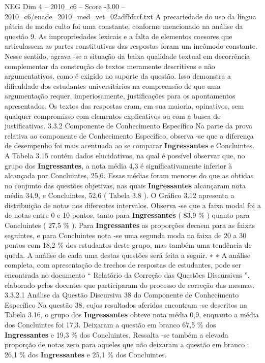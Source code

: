 \begin{textsample}{NEG Dim 4 – 2010\_c6 – Score -3.00 – 2010\_c6/enade\_2010\_med\_vet\_02adfbfccf.txt}
A precariedade do uso da língua pátria de modo culto foi uma constante, conforme mencionado na análise da questão 9.
As impropriedades lexicais e a falta de elementos coesores que articulassem as partes constitutivas das respostas foram um incômodo constante.
Nesse sentido, agrava -se a situação da baixa qualidade textual em decorrência complementar da construção de textos meramente descritivos e não argumentativos, como é exigido no suporte da questão.
Isso demonstra a dificuldade dos estudantes universitários na compreensão de que uma argumentação requer, imperiosamente, justificações para os apontamentos apresentados.
Os textos das respostas eram, em sua maioria, opinativos, sem qualquer compromisso com elementos explicativos ou com a busca de justificativas. 3.3.2 Componente de Conhecimento Específico Na parte da prova relativa ao componente de Conhecimento Específico, observa -se que a diferença de desempenho foi mais acentuada ao se comparar \textbf{Ingressantes} e Concluintes.
A Tabela 3.15 contém dados elucidativos, na qual é possível observar que, no grupo dos \textbf{Ingressantes}, a nota média 4,3 é significativamente inferior à alcançada por Concluintes, 25,6.
Essas médias foram menores do que as obtidas no conjunto das questões objetivas, nas quais \textbf{Ingressantes} alcançaram nota média 34,9, e Concluintes, 52,6 ( Tabela 3.8 ).
O Gráfico 3.12 apresenta a distribuição de notas nos diferentes intervalos.
Observa -se que a faixa modal foi a de notas entre 0 e 10 pontos, tanto para \textbf{Ingressantes} ( 83,9 \% ) quanto para Concluintes ( 27,5 \% ).
Para \textbf{Ingressantes} as proporções decaem para as faixas seguintes, e para Concluintes nota -se uma segunda moda na faixa de 20 a 30 pontos com 18,2 \% dos estudantes deste grupo, mas também uma tendência de queda.
A análise de cada uma destas questões será feita a seguir. ∗ ∗ A análise completa, com apresentação de trechos de respostas de estudantes, pode ser encontrada no documento “ Relatório da Correção das Questões Discursivas ”, elaborado pelos docentes que participaram do processo de correção das mesmas. 3.3.2.1 Análise da Questão Discursiva 38 do Componente de Conhecimento Específico Na questão 38, cujos resultados aferidos encontram -se descritos na Tabela 3.16, o grupo dos \textbf{Ingressantes} obteve nota média 0,9, enquanto a média dos Concluintes foi 17,3.
Deixaram a questão em branco 67,5 \% dos \textbf{Ingressantes} e 19,3 \% dos Concluintes.
Ressalta -se também a elevada proporção de notas zero para aqueles que não deixaram a questão em branco : 26,1 \% dos \textbf{Ingressantes} e 25,1 \% dos Concluintes.

\end{textsample}
